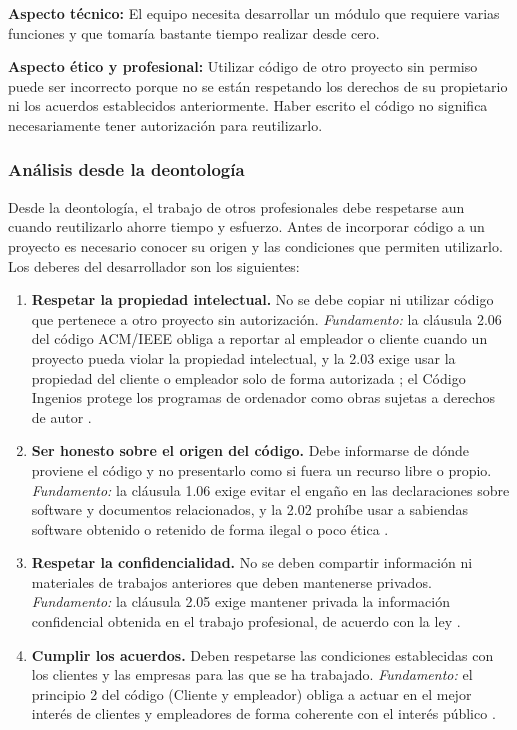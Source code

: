 \documentclass[12pt,a4paper,oneside]{article}
\newcommand{\cita}[1]{\cite{#1}}
\begin{document}
\textbf{Aspecto técnico:} El equipo necesita desarrollar un módulo que requiere varias funciones y que tomaría bastante tiempo realizar desde cero.

\textbf{Aspecto ético y profesional:} Utilizar código de otro proyecto sin permiso puede ser incorrecto porque no se están respetando los derechos de su propietario ni los acuerdos establecidos anteriormente. Haber escrito el código no significa necesariamente tener autorización para reutilizarlo.

\subsubsection{Análisis desde la deontología}

Desde la deontología, el trabajo de otros profesionales debe respetarse aun cuando reutilizarlo ahorre tiempo y esfuerzo. Antes de incorporar código a un proyecto es necesario conocer su origen y las condiciones que permiten utilizarlo. Los deberes del desarrollador son los siguientes:

\begin{enumerate}[leftmargin=1.8em,itemsep=4pt]
    \item \textbf{Respetar la propiedad intelectual.} No se debe copiar ni utilizar código que pertenece a otro proyecto sin autorización. \emph{Fundamento:} la cláusula 2.06 del código ACM/IEEE obliga a reportar al empleador o cliente cuando un proyecto pueda violar la propiedad intelectual, y la 2.03 exige usar la propiedad del cliente o empleador solo de forma autorizada \cita{ref:acm}; el Código Ingenios protege los programas de ordenador como obras sujetas a derechos de autor \cita{ref:ingenios}.
    \item \textbf{Ser honesto sobre el origen del código.} Debe informarse de dónde proviene el código y no presentarlo como si fuera un recurso libre o propio. \emph{Fundamento:} la cláusula 1.06 exige evitar el engaño en las declaraciones sobre software y documentos relacionados, y la 2.02 prohíbe usar a sabiendas software obtenido o retenido de forma ilegal o poco ética \cita{ref:acm}.
    \item \textbf{Respetar la confidencialidad.} No se deben compartir información ni materiales de trabajos anteriores que deben mantenerse privados. \emph{Fundamento:} la cláusula 2.05 exige mantener privada la información confidencial obtenida en el trabajo profesional, de acuerdo con la ley \cita{ref:acm}.
    \item \textbf{Cumplir los acuerdos.} Deben respetarse las condiciones establecidas con los clientes y las empresas para las que se ha trabajado. \emph{Fundamento:} el principio 2 del código (Cliente y empleador) obliga a actuar en el mejor interés de clientes y empleadores de forma coherente con el interés público \cita{ref:acm}.
\end{enumerate}
\end{document}
